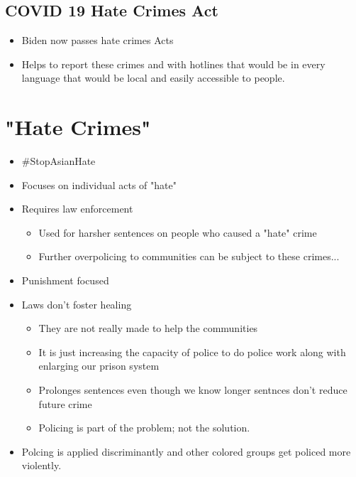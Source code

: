 \documentclass{article}
\begin{document}
\subsection{COVID 19 Hate Crimes Act}

\begin{itemize}
  \item Biden now passes hate crimes Acts
  \item Helps to report these crimes and with hotlines that would
    be in every language that would be local and easily accessible to people.
\end{itemize}

\section{"Hate Crimes"}

\begin{itemize}
  \item \#StopAsianHate
  \item Focuses on individual acts of "hate"
  \item Requires law enforcement
    \begin{itemize}
  \item Used for harsher sentences on people who caused a "hate" crime
  \item Further overpolicing to communities can be subject to
    these crimes...
    \end{itemize}
  \item Punishment focused
  \item Laws don't foster healing
    \begin{itemize}
      \item They are not really made to help the communities
      \item It is just increasing the capacity of police to do police work
        along with enlarging our prison system
      \item Prolonges sentences even though we know longer sentnces don't reduce
        future crime
      \item Policing is part of the problem; not the solution.
    \end{itemize}
  \item Polcing is applied discriminantly and other colored groups get
    policed more violently.
\end{itemize}
\end{document}
